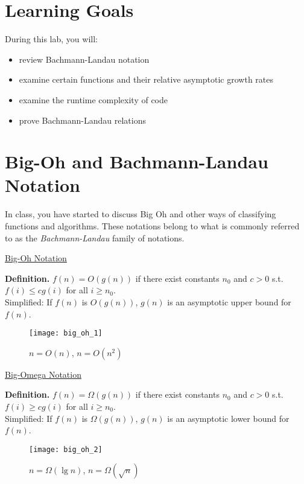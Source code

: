 


\section*{Learning Goals}
During this lab, you will:
\begin{itemize}
    \item review Bachmann-Landau notation
    \item examine certain functions and their relative asymptotic growth rates
    \item examine the runtime complexity of code
    \item prove Bachmann-Landau relations
\end{itemize}

\section*{Big-Oh and Bachmann-Landau Notation}

In class, you have started to discuss Big Oh and other ways of classifying functions and algorithms. These notations belong to what is commonly referred to as the \textit{Bachmann-Landau} family of notations.
    
\begin{framed}\relax
    \begin{center}\relax
        \underline{Big-Oh Notation}
    \end{center}
    \textbf{Definition.} $f(n) = O(g(n))$ if there exist constants $n_0$ and $c > 0$ s.t. $f(i) \leq c g(i)$ for all $i \geq n_0$.\\

    Simplified: If $f(n)$ is $O(g(n))$, $g(n)$ is an asymptotic upper bound for $f(n)$.
\end{framed}
\begin{figure}[h]
    \centering
    \texttt{[image: big\_oh\_1]}
    \caption*{$n = O(n)$, $n = O(n^2)$}
\end{figure}

\begin{framed}
    \begin{center}
        \underline{Big-Omega Notation}
    \end{center}
    \textbf{Definition.} $f(n) = \Omega(g(n))$ if there exist constants $n_0$ and $c > 0$ s.t. $f(i) \geq c g(i)$ for all $i \geq n_0$.\\

    Simplified: If $f(n)$ is $\Omega(g(n))$, $g(n)$ is an asymptotic lower bound for $f(n)$.
\end{framed}
\begin{figure}[h]
    \centering
    \texttt{[image: big\_oh\_2]}
    \caption*{$n = \Omega(\lg n)$, $n = \Omega(\sqrt{n})$}
\end{figure}

